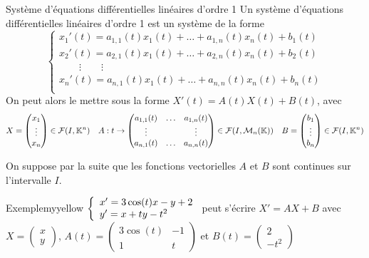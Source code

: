     \begin{defi}{Système d’équations différentielles linéaires d’ordre 1}{}
        Un système d’équations différentielles linéaires d’ordre 1 est un système de la forme 
        \[ \left\{ \begin{array}{l}
            x_1'(t) = a_{1,1}(t)x_1(t) + \ldots + a_{1,n}(t) x_n(t) + b_1(t) \\
            x_2'(t) = a_{2,1}(t)x_1(t) + \ldots + a_{2,n}(t) x_n(t) + b_2(t) \\
            \qquad \vdots \qquad \vdots \\
            x_n'(t) = a_{n,1}(t)x_1(t) + \ldots + a_{n,n}(t) x_n(t) + b_n(t) \\
        \end{array} \right. \]
        On peut alors le mettre sous la forme $X'(t) = A(t)X(t) + B(t)$, avec 
        \[ X = \begin{pmatrix}
            x_1 \\
            \vdots \\
            x_n
        \end{pmatrix} \in \mathcal{F}(I,\mathbb{K}^n) \quad A: t \rightarrow \begin{pmatrix}
            a_{1,1}(t) & \ldots & a_{1,n}(t) \\ 
            \vdots & & \vdots \\
            a_{n,1}(t) & \ldots & a_{n,n}(t)
        \end{pmatrix} \in \mathcal{F}(I,\mathcal{M}_{n}(\mathbb{K})) \quad B = \begin{pmatrix}
            b_1 \\
            \vdots \\
            b_n 
        \end{pmatrix} \in \mathcal{F}(I,\mathbb{K}^n) \]
    \end{defi}

    On suppose par la suite que les fonctions vectorielles $A$ et $B$ sont continues sur l’intervalle $I$.

    \begin{omed}{Exemple}{myyellow}
        $\et{x' = 3 \cos(t)x - y + 2}{y' = x + ty - t^2}$ peut s’écrire $X' = AX + B$ avec $X = \begin{pmatrix}
            x \\
            y
        \end{pmatrix}$, $A(t) = \begin{pmatrix}
            3 \cos(t) & -1 \\
            1 & t 
        \end{pmatrix}$ et $B(t) = \begin{pmatrix}
            2 \\
            -t^2
        \end{pmatrix}$
    \end{omed}

